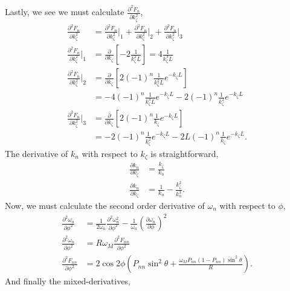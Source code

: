 \documentclass{article}
\begin{document}
Lastly, we see we must calculate $\frac{\partial^2 F_{n}}{\partial k_{\zeta}^2}$,
\begin{align}
\frac{\partial^2 F_{n}}{\partial k_{\zeta}^2} &= \frac{\partial^2 F_{n}}{\partial k_{\zeta}^2}\bigg|_{1} + \frac{\partial^2 F_{n}}{\partial k_{\zeta}^2}\bigg|_{2} + \frac{\partial^2 F_{n}}{\partial k_{\zeta}^2}\bigg|_{3} \\
\frac{\partial^2 F_{n}}{\partial k_{\zeta}^2}\bigg|_{1} &= \frac{\partial}{\partial k_{\zeta}} \left[-2 \frac{1}{k_{\zeta}^2L} \right]= 4 \frac{1}{k_{\zeta}^3 L} \\
\frac{\partial^2 F_{n}}{\partial k_{\zeta}^2}\bigg|_{2} &= \frac{\partial}{\partial k_{\zeta}} \left[ 2 (-1)^n \frac{1}{k_{\zeta}^2 L} e^{-k_{\zeta} L } \right] \\
&= -4 (-1)^n \frac{1}{k_{\zeta}^3 L} e^{-k_{\zeta} L} - 2 (-1)^n \frac{1}{k_{\zeta}^2} e^{- k_{\zeta} L} \\
\frac{\partial^2 F_{n}}{\partial k_{\zeta}^2}\bigg|_{3} &= \frac{\partial}{\partial k_{\zeta}} \left[ 2 (-1)^n \frac{1}{k_{\zeta}} e^{- k_{\zeta} L } \right] \\
&= -2 (-1)^n \frac{1}{k_{\zeta}^2} e^{- k_{\zeta} L } - 2L (-1)^n \frac{1}{k_{\zeta}} e^{- k_{\zeta} L}.
\end{align}
The derivative of $k_{n}$ with respect to $k_{\zeta}$ is straightforward,
\begin{align}
\frac{\partial k_{n}}{\partial k_{\zeta}} &= \frac{k_{\zeta}}{k_{n}} \\
\frac{\partial k_{n}}{\partial k_{\zeta}} &= \frac{1}{k_{n}} - \frac{k_{\zeta}^2}{k_{n}^3}.
\end{align}
Now, we must calculate the second order derivative of $\omega_{n}$ with respect to $\phi$,
\begin{align}
\frac{\partial^2 \omega_{n}}{\partial \phi^2} &= \frac{1}{2 \omega_{n}} \frac{\partial^2 \omega_{n}^2}{\partial \phi^2} - \frac{1}{\omega_{n}} \left(\frac{\partial \omega_{n}}{\partial \phi}\right)^2 \\
\frac{\partial^2 \omega_{n}}{\partial \phi^2} &= R \omega_{M} \frac{\partial^2 F_{nn}}{\partial \phi^2} \\
\frac{\partial^2 F_{nn}}{\partial \phi^2} &= 2 \cos{2\phi} \left( P_{nn} \sin^2{\theta} + \frac{\omega_{M} P_{nn} (1-P_{nn}) \sin^2{\theta}}{R} \right).
\end{align}
And finally the mixed-derivatives,
\end{document}
